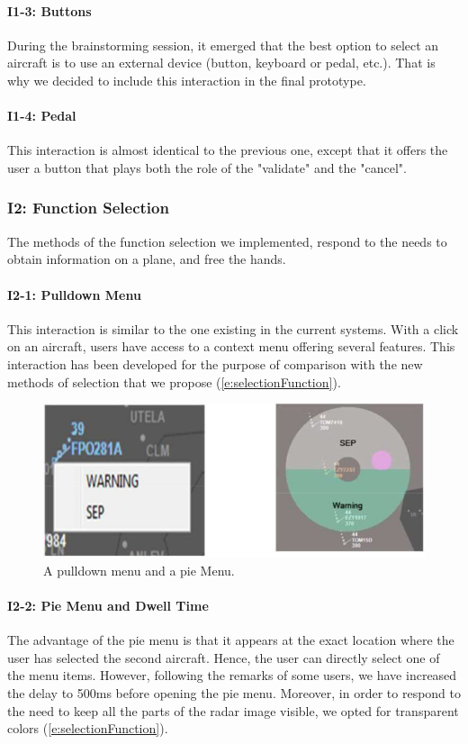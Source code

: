 \paragraph{I1-3: Buttons}
During the brainstorming session, it emerged that the best
option to select an aircraft is to use an external device
(button, keyboard or pedal, etc.). That is why we decided to
include this interaction in the final prototype.

\paragraph{I1-4: Pedal}
This interaction is almost identical to the previous one,
except that it offers the user a button that plays both the role
of the "validate" and the "cancel".

\subsubsection{I2: Function Selection}
The methods of the function selection we implemented,
respond to the needs to obtain information on a plane, and
free the hands.
 
\paragraph{I2-1: Pulldown Menu}
This interaction is similar to the one existing in the current
systems. With a click on an aircraft, users have access to a
context menu offering several features. This interaction has
been developed for the purpose of comparison with the new
methods of selection that we propose (\autoref{e:selectionFunction}).
\begin{figure}
 \centering
	\includegraphics[width=\textwidth]{Figures/selectionFunction.png}
	\caption{
	A pulldown menu and a pie Menu.}
	\label{e:selectionFunction}
\end{figure}

\paragraph{I2-2: Pie Menu and Dwell Time}
The advantage of the pie menu is that it appears at the exact
location where the user has selected the second aircraft.
Hence, the user can directly select one of the menu items.
However, following the remarks of some users, we have
increased the delay to 500ms before opening the pie menu.
Moreover, in order to respond to the need to keep all the
parts of the radar image visible, we opted for transparent
colors (\autoref{e:selectionFunction}).


